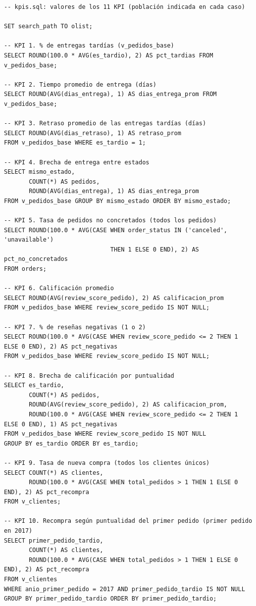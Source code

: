 \documentclass[a4paper,stu,12pt,donotrepeattitle,floatsintext]{apa7}
\begin{document}
\begin{lstlisting}
-- kpis.sql: valores de los 11 KPI (población indicada en cada caso)

SET search_path TO olist;

-- KPI 1. % de entregas tardías (v_pedidos_base)
SELECT ROUND(100.0 * AVG(es_tardio), 2) AS pct_tardias FROM v_pedidos_base;

-- KPI 2. Tiempo promedio de entrega (días)
SELECT ROUND(AVG(dias_entrega), 1) AS dias_entrega_prom FROM v_pedidos_base;

-- KPI 3. Retraso promedio de las entregas tardías (días)
SELECT ROUND(AVG(dias_retraso), 1) AS retraso_prom
FROM v_pedidos_base WHERE es_tardio = 1;

-- KPI 4. Brecha de entrega entre estados
SELECT mismo_estado,
       COUNT(*) AS pedidos,
       ROUND(AVG(dias_entrega), 1) AS dias_entrega_prom
FROM v_pedidos_base GROUP BY mismo_estado ORDER BY mismo_estado;

-- KPI 5. Tasa de pedidos no concretados (todos los pedidos)
SELECT ROUND(100.0 * AVG(CASE WHEN order_status IN ('canceled', 'unavailable')
                              THEN 1 ELSE 0 END), 2) AS pct_no_concretados
FROM orders;

-- KPI 6. Calificación promedio
SELECT ROUND(AVG(review_score_pedido), 2) AS calificacion_prom
FROM v_pedidos_base WHERE review_score_pedido IS NOT NULL;

-- KPI 7. % de reseñas negativas (1 o 2)
SELECT ROUND(100.0 * AVG(CASE WHEN review_score_pedido <= 2 THEN 1 ELSE 0 END), 2) AS pct_negativas
FROM v_pedidos_base WHERE review_score_pedido IS NOT NULL;

-- KPI 8. Brecha de calificación por puntualidad
SELECT es_tardio,
       COUNT(*) AS pedidos,
       ROUND(AVG(review_score_pedido), 2) AS calificacion_prom,
       ROUND(100.0 * AVG(CASE WHEN review_score_pedido <= 2 THEN 1 ELSE 0 END), 1) AS pct_negativas
FROM v_pedidos_base WHERE review_score_pedido IS NOT NULL
GROUP BY es_tardio ORDER BY es_tardio;

-- KPI 9. Tasa de nueva compra (todos los clientes únicos)
SELECT COUNT(*) AS clientes,
       ROUND(100.0 * AVG(CASE WHEN total_pedidos > 1 THEN 1 ELSE 0 END), 2) AS pct_recompra
FROM v_clientes;

-- KPI 10. Recompra según puntualidad del primer pedido (primer pedido en 2017)
SELECT primer_pedido_tardio,
       COUNT(*) AS clientes,
       ROUND(100.0 * AVG(CASE WHEN total_pedidos > 1 THEN 1 ELSE 0 END), 2) AS pct_recompra
FROM v_clientes
WHERE anio_primer_pedido = 2017 AND primer_pedido_tardio IS NOT NULL
GROUP BY primer_pedido_tardio ORDER BY primer_pedido_tardio;


\end{lstlisting}
\end{document}
